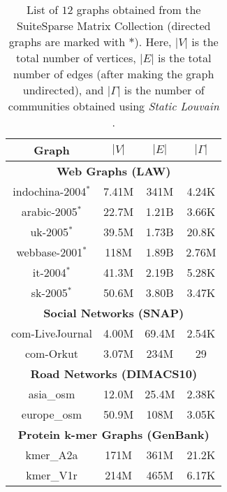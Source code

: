 \begin{table}[hbtp]
  \centering
  \caption{List of $12$ graphs obtained from the SuiteSparse Matrix Collection \cite{suite19} (directed graphs are marked with $*$). Here, $|V|$ is the total number of vertices, $|E|$ is the total number of edges (after making the graph undirected), and $|\Gamma|$ is the number of communities obtained using \textit{Static Louvain} \cite{sahu2023gvelouvain}.}
  \label{tab:dataset-large}
  \begin{tabular}{|c||c|c|c|}
    \toprule
    \textbf{Graph} &
    \textbf{\textbf{$|V|$}} &
    \textbf{\textbf{$|E|$}} &
    \textbf{\textbf{$|\Gamma|$}} \\
    \midrule
    \multicolumn{4}{|c|}{\textbf{Web Graphs (LAW)}} \\ \hline
    indochina-2004$^*$ & 7.41M & 341M & 4.24K \\ \hline
    arabic-2005$^*$ & 22.7M & 1.21B & 3.66K \\ \hline
    uk-2005$^*$ & 39.5M & 1.73B & 20.8K \\ \hline
    webbase-2001$^*$ & 118M & 1.89B & 2.76M \\ \hline
    it-2004$^*$ & 41.3M & 2.19B & 5.28K \\ \hline
    sk-2005$^*$ & 50.6M & 3.80B & 3.47K \\ \hline
    \multicolumn{4}{|c|}{\textbf{Social Networks (SNAP)}} \\ \hline
    com-LiveJournal & 4.00M & 69.4M & 2.54K \\ \hline
    com-Orkut & 3.07M & 234M & 29 \\ \hline
    \multicolumn{4}{|c|}{\textbf{Road Networks (DIMACS10)}} \\ \hline
    asia\_osm & 12.0M & 25.4M & 2.38K \\ \hline
    europe\_osm & 50.9M & 108M & 3.05K \\ \hline
    \multicolumn{4}{|c|}{\textbf{Protein k-mer Graphs (GenBank)}} \\ \hline
    kmer\_A2a & 171M & 361M & 21.2K \\ \hline
    kmer\_V1r & 214M & 465M & 6.17K \\ \hline
  \bottomrule
  \end{tabular}
\end{table}
